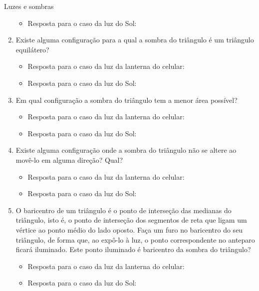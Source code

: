 \begin{task}{Luzes e sombras}
\begin{enumerate}
\begin{itemize}
\item {} 
Resposta para o caso da luz do Sol:

\end{itemize}

\item {} 
Existe alguma configuração para a qual a sombra do triângulo é um triângulo equilátero?
\begin{itemize}
\item {} 
Resposta para o caso da luz da lanterna do celular:

\item {} 
Resposta para o caso da luz do Sol:

\end{itemize}

\item {} 
Em qual configuração a sombra do triângulo tem a menor área possível?
\begin{itemize}
\item {} 
Resposta para o caso da luz da lanterna do celular:

\item {} 
Resposta para o caso da luz do Sol:

\end{itemize}

\item {} 
Existe alguma configuração onde a sombra do triângulo não se altere ao movê-lo em alguma direção? Qual?
\begin{itemize}
\item {} 
Resposta para o caso da luz da lanterna do celular:

\item {} 
Resposta para o caso da luz do Sol:

\end{itemize}

\item {} 
O baricentro de um triângulo é o  ponto de interseção das medianas do triângulo, isto é, o ponto de interseção dos segmentos de reta que ligam um vértice ao ponto médio do lado oposto. Faça um furo no baricentro do seu triângulo, de forma que, ao expô-lo à luz, o ponto correspondente no anteparo ficará iluminado. Este ponto iluminado é baricentro da sombra do triângulo?
\begin{itemize}
\item {} 
Resposta para o caso da luz da lanterna do celular:

\item {} 
Resposta para o caso da luz do Sol:


\end{itemize}
\end{enumerate}
\end{task}
